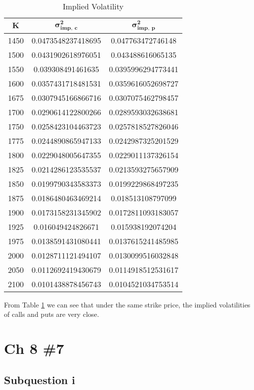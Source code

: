\documentclass{article}
\DeclareMathOperator{\1}{\mathit{1}}
\numberwithin{figure}{section} %
\numberwithin{table}{section}
\begin{document}
	\begin{table}[hbtp]
	\centering
    \caption{\label{tab:impVol}%
    Implied Volatility}
    \small
    \begin{tabular}{ccc}
    \hline\hline
    $\mathbf{K}$ & $\mathbf{\sigma^2_{imp,~c}}$ & $\mathbf{\sigma^2_{imp,~p}}$\\ 
    \hline
1450 & 0.0473548237418695 & 0.047763472746148\\
1500 & 0.0431902618976051 & 0.043488616065135\\
1550 & 0.039308491461635 & 0.0395996294773441\\
1600 & 0.0357431718481531 & 0.0359616052698727\\
1675 & 0.0307945166866716 & 0.0307075462798457\\
1700 & 0.0290614122800266 & 0.0289593032638681\\
1750 & 0.0258423104463723 & 0.0257818527826046\\
1775 & 0.0244890865947133 & 0.0242987325201529\\
1800 & 0.0229048005647355 & 0.0229011137326154\\
1825 & 0.0214286123535537 & 0.0213593275657909\\
1850 & 0.0199790343583373 & 0.0199229868497235\\
1875 & 0.0186480463469214 & 0.018513108797099\\
1900 & 0.0173158231345902 & 0.0172811093183057\\
1925 & 0.016049424826671 & 0.015938192074204\\
1975 & 0.0138591431080441 & 0.0137615241485985\\
2000 & 0.0128711121494107 & 0.0130099516032848\\
2050 & 0.0112692419430679 & 0.0114918512531617\\
2100 & 0.0101438878456743 & 0.0104521034753514\\
    \hline\hline
    \end{tabular}
    \end{table}

From Table \ref{tab:impVol} we can see that under the same strike price, the implied volatilities of calls and puts are very close.
\section{Ch 8 \#7}
\subsection{Subquestion i}
\end{document}

